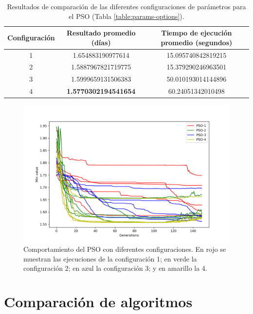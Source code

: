   \begin{table}[ht!]
    \caption{
      Resultados de comparación de las diferentes configuraciones de
      parámetros para el PSO (Tabla \ref{table:params-options}).
    }
    \begin{center}
      \begin{tabular}{|c|c|c|}
        \hline
        Configuración & Resultado promedio (días) & Tiempo de ejecución
          promedio (segundos) \\
        \hline
        1 & 1.654883190977614 & 15.095740842819215 \\
        \hline
        2 & 1.5887967821719775 & 15.379290246963501 \\
        \hline
        3 & 1.5999659131506383 & 50.010193014144896 \\
        \hline
        4 & \bfseries 1.5770302194541654 & 60.24051342010498 \\
        \hline
      \end{tabular}
      \label{table:params-results}
    \end{center}
  \end{table}

  \begin{figure}[ht!]
    \centering
    \includegraphics[width=\textwidth]{params-search-lines.png}
    \caption{
      Comportamiento del PSO con diferentes configuraciones. En rojo se
      muestran las ejecuciones de la configuración 1; en verde la
      configuración 2; en azul la configuración 3; y en amarillo la 4.
    }
    \label{fig:params-search-lines}
  \end{figure}

\section{Comparación de algoritmos}

